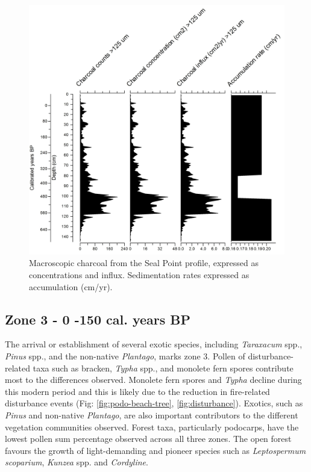 \documentclass{article}
\begin{document}
\begin{figure}
	\centering
	\includegraphics[scale=0.07, angle=90]{seal.jpg}
	\caption[Changes in charcoal concentration from Seal Point]{Macroscopic charcoal from the Seal Point profile, expressed as concentrations and influx.  Sedimentation rates expressed as accumulation (cm/yr).}
	\label{fig:charcoal-seal}
\end{figure}

\subsection{Zone 3 - 0 -150 cal. years BP}
The arrival or establishment of several exotic species, including \textit{Taraxacum} spp., \textit{Pinus} spp., and the non-native \textit{Plantago}, marks zone 3.  Pollen of disturbance-related taxa such as bracken, \textit{Typha} spp., and monolete fern spores contribute most to the differences observed.  Monolete fern spores and \textit{Typha} decline during this modern period and this is likely due to the reduction in fire-related disturbance events (Fig: \ref{fig:podo-beach-tree}, \ref{fig:disturbance}).  Exotics, such as \textit{Pinus} and non-native \textit{Plantago}, are also important contributors to the different vegetation communities observed.   Forest taxa, particularly podocarps, have the lowest pollen sum percentage observed across all three zones.  The open forest favours the growth of light-demanding and pioneer species such as \textit{Leptospermum scoparium}, \textit{Kunzea} spp. and \textit{Cordyline}.
\end{document}
